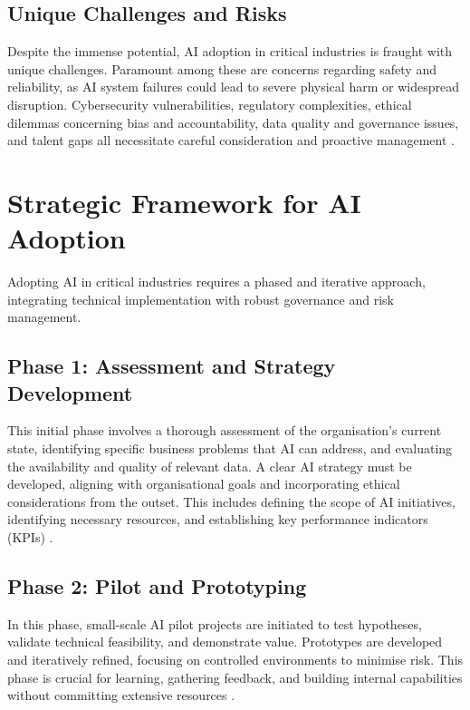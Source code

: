 \subsection{Unique Challenges and Risks}

Despite the immense potential, AI adoption in critical industries is fraught with unique challenges. Paramount among these are concerns regarding safety and reliability, as AI system failures could lead to severe physical harm or widespread disruption. Cybersecurity vulnerabilities, regulatory complexities, ethical dilemmas concerning bias and accountability, data quality and governance issues, and talent gaps all necessitate careful consideration and proactive management \parencite{dhs2024roles}.

\section{Strategic Framework for AI Adoption}

Adopting AI in critical industries requires a phased and iterative approach, integrating technical implementation with robust governance and risk management.

\subsection{Phase 1: Assessment and Strategy Development}

This initial phase involves a thorough assessment of the organisation's current state, identifying specific business problems that AI can address, and evaluating the availability and quality of relevant data. A clear AI strategy must be developed, aligning with organisational goals and incorporating ethical considerations from the outset. This includes defining the scope of AI initiatives, identifying necessary resources, and establishing key performance indicators (KPIs) \parencite{leyliabadi2025conceptual}.

\subsection{Phase 2: Pilot and Prototyping}

In this phase, small-scale AI pilot projects are initiated to test hypotheses, validate technical feasibility, and demonstrate value. Prototypes are developed and iteratively refined, focusing on controlled environments to minimise risk. This phase is crucial for learning, gathering feedback, and building internal capabilities without committing extensive resources \parencite{cisc2025artificial}.


